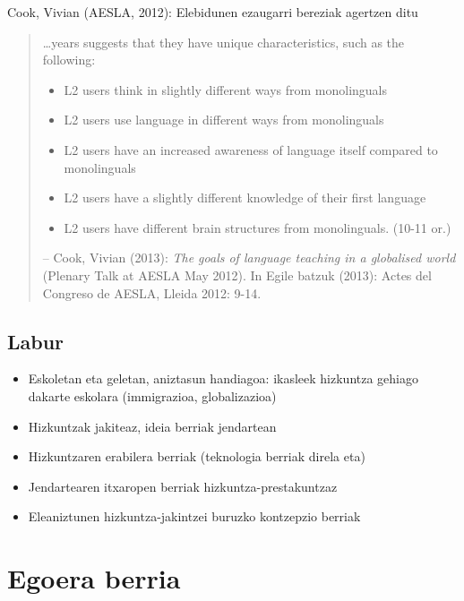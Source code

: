 \documentclass[
]{book}
\providecommand{\tightlist}{%
  \setlength{\itemsep}{0pt}\setlength{\parskip}{0pt}}
\begin{document}
Cook, Vivian (AESLA, 2012):
Elebidunen ezaugarri bereziak agertzen ditu

\begin{quote}
\ldots years suggests that they have unique characteristics, such as the following:

\begin{itemize}
\tightlist
\item
  L2 users think in slightly different ways from monolinguals
\item
  L2 users use language in different ways from monolinguals
\item
  L2 users have an increased awareness of language itself compared to monolinguals
\item
  L2 users have a slightly different knowledge of their first language
\item
  L2 users have different brain structures from monolinguals. (10-11 or.)
\end{itemize}

-- Cook, Vivian (2013): \emph{The goals of language teaching in a globalised world} (Plenary Talk at AESLA May 2012). In Egile batzuk (2013): Actes del Congreso de AESLA, Lleida 2012: 9-14.
\end{quote}

\hypertarget{labur}{%
\subsection*{Labur}\label{labur}}

\begin{itemize}
\tightlist
\item
  Eskoletan eta geletan, aniztasun handiagoa: ikasleek hizkuntza gehiago dakarte eskolara (immigrazioa, globalizazioa)
\item
  Hizkuntzak jakiteaz, ideia berriak jendartean
\item
  Hizkuntzaren erabilera berriak (teknologia berriak direla eta)
\item
  Jendartearen itxaropen berriak hizkuntza-prestakuntzaz
\item
  Eleaniztunen hizkuntza-jakintzei buruzko kontzepzio berriak
\end{itemize}

\hypertarget{egoera-berria}{%
\section{Egoera berria}\label{egoera-berria}}
\end{document}
